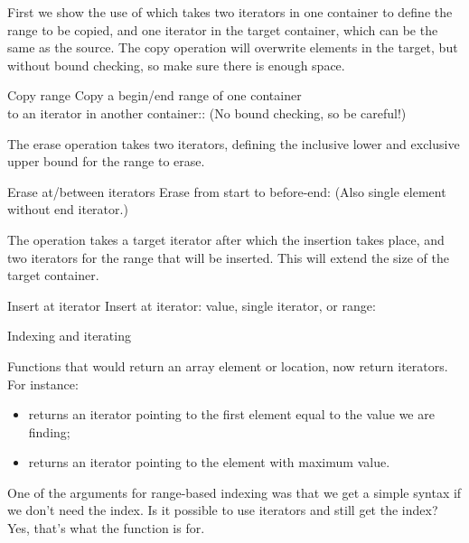 First we show the use of  which takes
two iterators in one container to define the range to be copied,
and one iterator in the target container, which can be the same as the source.
The copy operation will overwrite elements in the target,
but without bound checking, so make sure there is enough space.

\begin{block}{Copy range}
  \label{sl:iter-copy}
  Copy a begin/end range of one container\\
  to an iterator in another container::
  (No bound checking, so be careful!)
\end{block}

The erase operation  takes two iterators,
defining the inclusive lower and exclusive upper bound
for the range to erase.

\begin{block}{Erase at/between iterators}
  \label{sl:iter-erase}
  Erase from start to before-end:
  (Also single element without end iterator.)
\end{block}

The  operation takes a target iterator
after which the insertion takes place, and
two iterators for the range that will be inserted.
This will extend the size of the target container.

\begin{block}{Insert at iterator}
  \label{sl:iter-insert}
  Insert at iterator: value, single iterator, or range:
\end{block}

 {Indexing and iterating}

Functions that would return an array element or location,
now return iterators. For instance:
\begin{itemize}
\item {} returns an iterator pointing to the first element
  equal to the value we are finding;
\item {} returns an iterator pointing to the
  element with maximum value.
\end{itemize}

One of the arguments for range-based indexing was
that we get a simple syntax if we don't need the index.
Is it possible to use iterators and still get the index?
Yes, that's what the function  is for.

